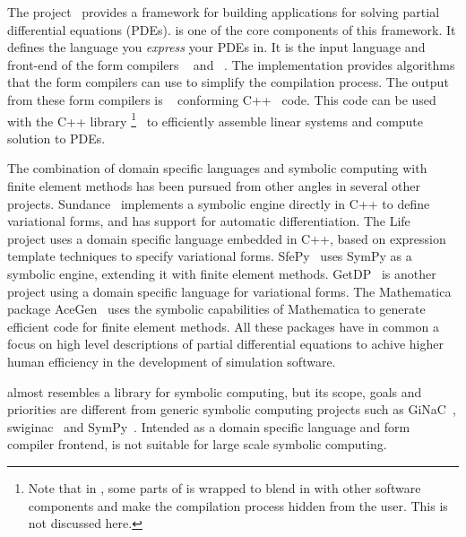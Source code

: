 The \fenics{} project~\cite{DupHof2003,www:fenics,Log2007} provides a framework for
building applications for solving partial differential equations (PDEs).
\ufl{} is one of the core components of this framework.
It defines the language you \emph{express} your PDEs in.
It is the input language and front-end of the form compilers
\ffc{}~\cite{KirLog2006,KirLog2007,manual:ffc,www:ffc,OelLog2008,OelWel2009}
and \sfc{}~\cite{www:syfi,manual:syfi}.  The \ufl{} implementation
provides algorithms that the form compilers can use to simplify the
compilation process.  The output from these form compilers is
\ufc{}~\cite{www:ufc,manual:ufc,AlnLog2009} conforming
C++~\cite{Str1997} code. This code can be used with the C++ library
\dolfin{}\footnote{Note that in \pydolfin{}, some parts of \ufl{} is
wrapped to blend in with other software components and make the
compilation process hidden from the user.  This is not discussed
here.}~\cite{LogWel2009,www:dolfin,manual:dolfin} to efficiently
assemble linear systems and compute solution to PDEs.

The combination of domain specific languages and symbolic computing
with finite element methods has been pursued from other angles in
several other projects.  Sundance~\cite{Lon03,Lon04a,www:sundance}
implements a symbolic engine directly in C++ to define variational
forms, and has support for automatic differentiation.  The
Life~\cite{Pru2006a,Pru2006b} project uses a domain specific language
embedded in C++, based on expression template techniques to specify
variational forms.  SfePy~\cite{www:sfepy} uses SymPy as a symbolic
engine, extending it with finite element methods.
GetDP~\cite{DulGeu2005,www:getdp} is another project using a domain
specific language for variational forms.  The Mathematica package
AceGen~\cite{Kor1997,Kor2002} uses the symbolic capabilities of
Mathematica to generate efficient code for finite element methods.
All these packages have in common a focus on high level descriptions
of partial differential equations to achive higher human efficiency in
the development of simulation software.

\ufl{} almost resembles a library for symbolic computing,
but its scope, goals and priorities are different from generic
symbolic computing projects such as GiNaC~\cite{www:ginac,BauFri2000},
swiginac~\cite{www:swiginac} and SymPy~\cite{www:sympy}.  Intended as
a domain specific language and form compiler frontend,
\ufl{} is not suitable for large scale symbolic computing.

